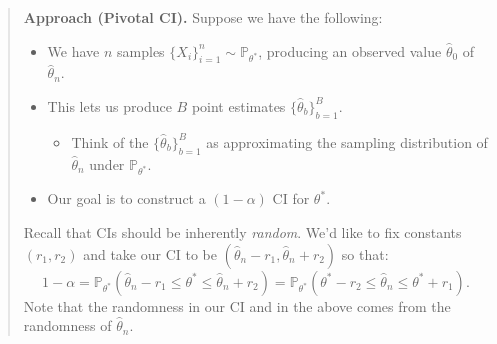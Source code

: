 \begin{quote}
    \textbf{Approach (Pivotal CI).}
    Suppose we have the following:
    \begin{itemize}
        \item We have $n$ samples $\{X_i\}_{i = 1}^n \sim \mathbb{P}_{\theta^*}$,
        producing an observed value $\hat{\theta}_0$ of $\hat{\theta}_n$.
        \item This lets us produce $B$ point estimates $\{\hat{\theta}_b\}_{b = 1}^{B}$.
        \begin{itemize}
            \item Think of the $\{\hat{\theta}_b\}_{b = 1}^B$ as approximating
            the sampling distribution of $\hat{\theta}_n$ under $\mathbb{P}_{\theta^*}$.
        \end{itemize}
        \item Our goal is to construct a $(1 - \alpha)$ CI for $\theta^*$.
    \end{itemize}
    Recall that CIs should be inherently \emph{random}.
    We'd like to fix constants $(r_1, r_2)$
    and take our CI to be $(\hat{\theta}_n - r_1, \hat{\theta}_n + r_2)$ so that:
    \[ 1 - \alpha = \mathbb{P}_{\theta^*}(\hat{\theta}_n - r_1 \leq \theta^* \leq \hat{\theta}_n + r_2)
    = \mathbb{P}_{\theta^*}(\theta^* - r_2 \leq \hat{\theta}_n \leq \theta^* + r_1). \]
    Note that the randomness in our CI and in the above
    comes from the randomness of $\hat{\theta}_n$.


\end{quote}
